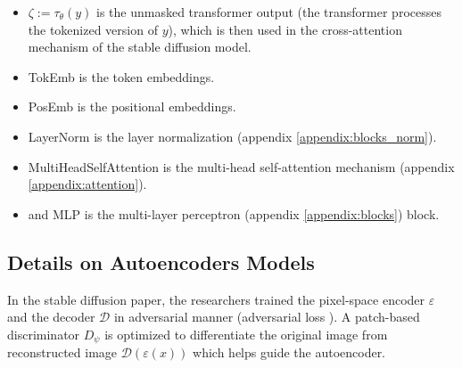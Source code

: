 \begin{itemize}
    \item $\zeta := \tau_\theta(y)$ is the unmasked transformer output (the transformer processes the tokenized version of $y$), which is then used in the cross-attention mechanism of the stable diffusion model.
    \item TokEmb is the token embeddings.
    \item PosEmb is the positional embeddings.
    \item LayerNorm is the layer normalization (appendix \ref{appendix:blocks_norm}).
    \item MultiHeadSelfAttention is the multi-head self-attention mechanism (appendix \ref{appendix:attention}).
    \item and MLP is the multi-layer perceptron (appendix \ref{appendix:blocks}) block.
\end{itemize}













\subsection{Details on Autoencoders Models}

In the stable diffusion paper, the researchers trained the pixel-space encoder $\varepsilon$ and the decoder $\mathcal{D}$ in adversarial manner (adversarial loss \cite{vqgan}). A patch-based discriminator $D_\psi$ is optimized to differentiate the original image from reconstructed image $\mathcal{D} (\varepsilon (x))$ which helps guide the autoencoder.

